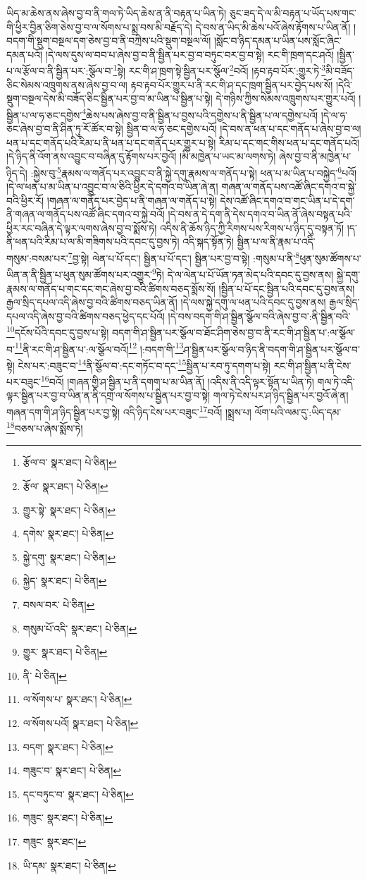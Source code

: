 ཡིད་མ་ཆེས་ནས་ཞེས་བྱ་བ་ནི་གལ་ཏེ་ཡིད་ཆེས་ན་ནི་བརྟན་པ་ཡིན་ཏེ། ཅུང་ཟད་དེ་ལ་མི་བརྟན་པ་ཡོད་པས་གང་གི་ཕྱིར་བྱིན་ཅིག་ཅེས་བྱ་བ་ལ་སོགས་པ་སྨྲ་བས་མི་བརྗོད་དེ། དེ་བས་ན་ཡིད་མི་ཆེས་པའོ་ཞེས་རྟོགས་པ་ཡིན་ནོ། །བདག་གི་སྡུག་བསྔལ་དག་ཅེས་བྱ་བ་ནི་བཀྲེས་པའི་སྡུག་བསྔལ་ལོ། །སློང་བ་ཉིད་དམན་པ་ཡིན་པས་སློང་ཞིང་དམན་པའོ། །དེ་ལས་དུས་ལ་བབ་པ་ཞེས་བྱ་བ་ནི་སྦྱིན་པར་བྱ་བ་བཏུང་བར་བྱ་བ་སྟེ། རང་གི་ཁྲག་དང་ཤའོ། །སྦྱིན་པ་ལ་རྩོལ་བ་ནི་སྦྱིན་པར་:སྩོལ་བ་\footnote{རྩོལ་བ་  སྣར་ཐང་།  པེ་ཅིན། }སྟེ། རང་གི་ཤ་ཁྲག་སྟེ་སྦྱིན་པར་སྩོལ་\footnote{རྩོལ་  སྣར་ཐང་།  པེ་ཅིན། }བའོ། །རྟབ་རྟབ་པོར་:གྱུར་ཏེ་\footnote{གྱུར་སྟེ་  སྣར་ཐང་།  པེ་ཅིན། }མི་བཟོད་ཅིང་སེམས་འཁྲུགས་ནས་ཞེས་བྱ་བ་ལ། རྟབ་རྟབ་པོར་གྱུར་པ་ནི་རང་གི་ཤ་དང་ཁྲག་སྦྱིན་པར་བྱེད་པས་སོ། །དེའི་སྡུག་བསྔལ་དེས་མི་བཟོད་ཅིང་སྦྱིན་པར་བྱ་བ་མ་ཡིན་པ་སྦྱིན་པ་སྟེ། དེ་གཉིས་ཀྱིས་སེམས་འཁྲུགས་པར་གྱུར་པའོ། །སྦྱིན་པ་ལ་ཧ་ཅང་དགྱེས་\footnote{དགེས་  སྣར་ཐང་།  པེ་ཅིན། }ཆེས་པས་ཞེས་བྱ་བ་ནི་སྦྱིན་པ་བྱས་པའི་དགྱེས་པ་ནི་སྦྱིན་པ་ལ་དགྱེས་པའོ། །དེ་ལ་ཧ་ཅང་ཞེས་བྱ་བ་ནི་ཤིན་ཏུ་རོ་ཚོར་བ་སྟེ། སྦྱིན་བ་ལ་ཧ་ཅང་དགྱེས་པའོ། །དེ་བས་ན་ཕན་པ་དང་གནོད་པ་ཞེས་བྱ་བ་ལ། ཕན་པ་དང་གནོད་པའི་རིམ་པ་ནི་ཕན་པ་དང་གནོད་པར་གྱུར་པ་སྟེ། རིམ་པ་དང་གང་གིས་ཕན་པ་དང་གནོད་པའོ། །དེ་ཉིད་ནི་འོག་ནས་འབྱུང་བ་བཞིན་དུ་རྟོགས་པར་བྱའོ། །མི་མཁྱེན་པ་ཡང་མ་ལགས་ཏེ། ཞེས་བྱ་བ་ནི་མཁྱེན་པ་ཉིད་དེ། :སྐྱེས་བུ་\footnote{སྐྱེ་དགུ་  སྣར་ཐང་།  པེ་ཅིན། }རྣམས་ལ་གནོད་པར་འབྱུང་བ་ནི་སྐྱེ་དགུ་རྣམས་ལ་གནོད་པ་སྟེ། ཕན་པ་མ་ཡིན་པ་བསྐྱེད་\footnote{སྐྱེད་  སྣར་ཐང་།  པེ་ཅིན། }པའོ། །དེ་ལ་ཕན་པ་མ་ཡིན་པ་འབྱུང་བ་ལ་ཅིའི་ཕྱིར་དེ་དགའ་བ་ཡིན་ཞེ་ན། གཞན་ལ་གནོད་པས་འཚོ་ཞིང་དགའ་བ་སྐྱེ་བའི་ཕྱིར་རོ། །གཞན་ལ་གནོད་པར་བྱེད་པ་ནི་གཞན་ལ་གནོད་པ་སྟེ། དེས་འཚོ་ཞིང་དགའ་བ་གང་ཡིན་པ་དེ་དག་ནི་གཞན་ལ་གནོད་པས་འཚོ་ཞིང་དགའ་བ་སྐྱེ་བའོ། །དེ་བས་ན་དེ་དག་ནི་དེས་དགའ་བ་ཡིན་ནོ་ཞེས་བསྟན་པའི་ཕྱིར་རང་བཞིན་དེ་ལྟར་ལགས་ཞེས་བྱ་བ་སྨོས་ཏེ། འདིས་ནི་ཆོས་ཉིད་ཀྱི་རིགས་པས་རིགས་པ་ཉིད་དུ་བསྟན་ཏོ། །ད་ནི་ཕན་པའི་རིམ་པ་ལ་མི་གཟིགས་པའི་དབང་དུ་བྱས་ཏེ། འདི་སྐད་སྟོན་ཏེ། སྦྱིན་པ་ལ་ནི་རྣམ་པ་འདི་གསུམ་:བསམ་པར་\footnote{བསལ་བར་  པེ་ཅིན། }བྱ་སྟེ། ལེན་པ་པོ་དང་། སྦྱིན་པ་པོ་དང་། སྦྱིན་པར་བྱ་བ་སྟེ། :གསུམ་པ་ནི་\footnote{གསུམ་པོ་འདི་  སྣར་ཐང་།  པེ་ཅིན། }ཕུན་སུམ་ཚོགས་པ་ཡིན་ན་ནི་སྦྱིན་པ་ཕུན་སུམ་ཚོགས་པར་འགྱུར་\footnote{གྱུར་  སྣར་ཐང་།  པེ་ཅིན། }ཏེ། དེ་ལ་ལེན་པ་པོ་ཡོན་ཏན་མེད་པའི་དབང་དུ་བྱས་ནས། སྐྱེ་དགུ་རྣམས་ལ་གནོད་པ་གང་དང་གང་ཞེས་བྱ་བའི་ཚིགས་བཅད་སྨོས་སོ། །སྦྱིན་པ་པོ་དང་སྦྱིན་པའི་དབང་དུ་བྱས་ནས། རྒྱལ་སྲིད་དཔལ་འདི་ཞེས་བྱ་བའི་ཚིགས་བཅད་ཡིན་ནོ། །དེ་ལས་སྐྱེ་དགུ་ལ་ཕན་པའི་དབང་དུ་བྱས་ནས། རྒྱལ་སྲིད་དཔལ་འདི་ཞེས་བྱ་བའི་ཚིགས་བཅད་ཕྱེད་དང་པོའོ། །དེ་བས་བདག་གི་ཤ་སྦྱིན་སྩོལ་བའི་ཞེས་བྱ་བ་:ནི་སྦྱིན་བའི་\footnote{ནི་  པེ་ཅིན། }དངོས་པོའི་དབང་དུ་བྱས་པ་སྟེ། བདག་གི་ཤ་སྦྱིན་པར་སྩོལ་བ་ཐོང་ཤིག་ཅེས་བྱ་བ་ནི་རང་གི་ཤ་སྦྱིན་པ་:ལ་སྩོལ་བ་\footnote{ལ་སོགས་པ་  སྣར་ཐང་།  པེ་ཅིན། }ནི་རང་གི་ཤ་སྦྱིན་པ་:ལ་སྩོལ་བའོ།\footnote{ལ་སོགས་པའོ།  སྣར་ཐང་།  པེ་ཅིན། } །:བདག་གི་\footnote{བདག་  སྣར་ཐང་།  པེ་ཅིན། }ཤ་སྦྱིན་པར་སྩོལ་བ་ཉིད་ནི་བདག་གི་ཤ་སྦྱིན་པར་སྩོལ་བ་སྟེ། ངེས་པར་:བཟུང་བ་\footnote{གཟུང་བ་  སྣར་ཐང་།  པེ་ཅིན། }ནི་སྩོལ་བ་:དང་གཏོང་བ་དང་\footnote{དང་བཏུང་བ་  སྣར་ཐང་།  པེ་ཅིན། }སྦྱིན་པ་རབ་ཏུ་དགག་པ་སྟེ། རང་གི་ཤ་སྦྱིན་པ་ནི་ངེས་པར་བཟུང་\footnote{གཟུང་  སྣར་ཐང་།  པེ་ཅིན། }བའོ། །གཞན་གྱི་ཤ་སྦྱིན་པ་ནི་དགག་པ་མ་ཡིན་ནོ། །འདིས་ནི་འདི་ལྟར་སྟོན་པ་ཡིན་ཏེ། གལ་ཏེ་འདི་ལྟར་སྦྱིན་པར་བྱ་བ་ཡིན་ན་ནི་དགྲ་ལ་སོགས་པ་སྦྱིན་པར་བྱ་བ་སྟེ། གལ་ཏེ་ངེས་པར་ཤ་ཉིད་སྦྱིན་པར་བྱའོ་ཞེ་ན། གཞན་དག་གི་ཤ་ཉིད་སྦྱིན་པར་བྱ་སྟེ། འདི་ཉིད་ངེས་པར་བཟུང་\footnote{གཟུང་  སྣར་ཐང་། }བའོ། །སྨྲས་པ། ལོག་པའི་ལམ་དུ་:ཡིད་དམ་\footnote{ཡི་དམ་  སྣར་ཐང་།  པེ་ཅིན། }བཅས་པ་ཞེས་སྨོས་ཏེ། 